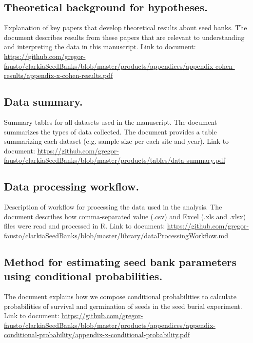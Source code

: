 \documentclass[12pt, oneside, titlepage]{article}   	%
\begin{document}
\subsection*{Theoretical background for hypotheses.} Explanation of key papers that develop theoretical results about seed banks. The document describes results from these papers that are relevant to understanding and interpreting the data in this manuscript. Link to document: \url{https://github.com/gregor-fausto/clarkiaSeedBanks/blob/master/products/appendices/appendix-cohen-results/appendix-x-cohen-results.pdf}

\subsection*{Data summary.} Summary tables for all datasets used in the manuscript. The document summarizes the types of data collected. The document provides a table summarizing each dataset (e.g. sample size per each site and year). Link to document: \url{https://github.com/gregor-fausto/clarkiaSeedBanks/blob/master/products/tables/data-summary.pdf}

\subsection*{Data processing workflow.} Description of workflow for processing the data used in the analysis. The document describes how comma-separated value (.csv) and Excel (.xls and .xlsx) files were read and processed in R. Link to document: \url{https://github.com/gregor-fausto/clarkiaSeedBanks/blob/master/library/dataProcessingWorkflow.md}

\subsection*{Method for estimating seed bank parameters using conditional probabilities.} The document explains how we compose conditional probabilities to calculate probabilities of survival and germination of seeds in the seed burial experiment. Link to document: \url{https://github.com/gregor-fausto/clarkiaSeedBanks/blob/master/products/appendices/appendix-conditional-probability/appendix-x-conditional-probability.pdf}
\end{document}
